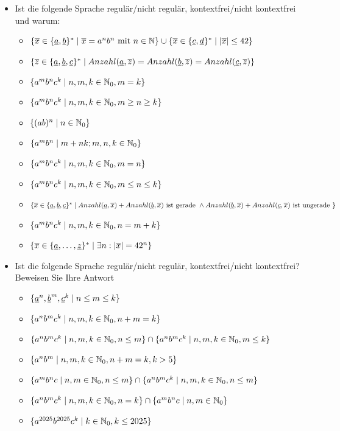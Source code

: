 \begin{itemize}
    \item Ist die folgende Sprache regulär/nicht regulär, kontextfrei/nicht kontextfrei und warum:
    \begin{itemize}
        \item $\{\overline{x} \in \{\underline{a}, \underline{b}\}^* \mid  \overline{x} = a^n b^n \text{ mit } n \in \mathbb{N}\} \cup \{ \overline{x} \in \{\underline{c}, \underline{d}\}^* \mid |\overline{x}| \leq 42 \}$ 
        \item
        $\{ \overline{z}  \in \{\underline{a}, \underline{b}, \underline{c}\}^* \mid Anzahl(\underline{a}, \overline{z}) = Anzahl(\underline{b}, \overline{z}) = Anzahl(\underline{c}, \overline{z}) \}$ 
        \item $\{a^m b^n c^k \mid n,m,k \in \mathbb{N}_0, m=k \}$ 
        \item $\{a^m b^n c^k \mid n,m,k \in \mathbb{N}_0, m \geq n \geq k \}$ 
        \item $\{(ab)^n \mid n \in \mathbb{N}_0 \}$ 
        \item $\{a^m b^n \mid m+n  k; m,n,k \in \mathbb{N}_0 \}$ 
        \item $\{a^m b^n c^k \mid n,m,k \in \mathbb{N}_0, m=n \}$ 
        \item $\{a^m b^n c^k \mid n,m,k \in \mathbb{N}_0, m \leq n \leq k \}$ 
        \item
        $\{\overline{x} \in \{\underline{a}, \underline{b},\underline{c} \}^* \mid Anzahl(\underline{a},\overline{x})+Anzahl(\underline{b},\overline{x}) \text{ ist gerade } \land Anzahl(\underline{b},\overline{x}) +Anzahl(\underline{c},\overline{x}) \text{ ist ungerade }  \}$ 
        \item $\{a^m b^n c^k \mid n,m,k \in \mathbb{N}_0, n = m+k\}$ 
        \item $\{ \overline{x} \in \{\underline{a}, \dots, \underline{z}\}^* \mid \exists n: |\overline{x}| = 42^n \}$ 
    \end{itemize}
    \item Ist die folgende Sprache regulär/nicht regulär, kontextfrei/nicht kontextfrei?
    Beweisen Sie Ihre
    Antwort
    \begin{itemize}
        \item $\{\underline{a}^n, \underline{b}^m, \underline{c}^k \mid n \leq m \leq k\}$ 
        \item  $\{a^n b^m c^k \mid n,m,k \in \mathbb{N}_0, n+m = k \}$ 
        \item   $\{a^n b^m c^k \mid n,m,k \in \mathbb{N}_0, n \leq m \} \cap \{ a^n b^m c^k \mid n,m,k \in \mathbb{N}_{0}, m \leq k \}$
        \item $\{ a^n b^m \mid n,m,k \in \mathbb{N}_0, n+m = k, k > 5 \}$ 
        \item $\{ a^m b^n c \mid n,m \in \mathbb{N}_0, n \leq m\} \cap \{a^n b^m c^k \mid n,m,k \in \mathbb{N}_0, n\leq m \}$ 
        \item   $\{a^n b^m c^k \mid n,m,k \in \mathbb{N}_0, n = k \} \cap \{ a^m b^n c \mid n,m \in \mathbb{N}_0 \}$ 
        \item $\{a^{2025} b^{2025} c^k \mid k \in \mathbb{N}_0, k \leq 2025 \}$ 
    \end{itemize}
\end{itemize}

